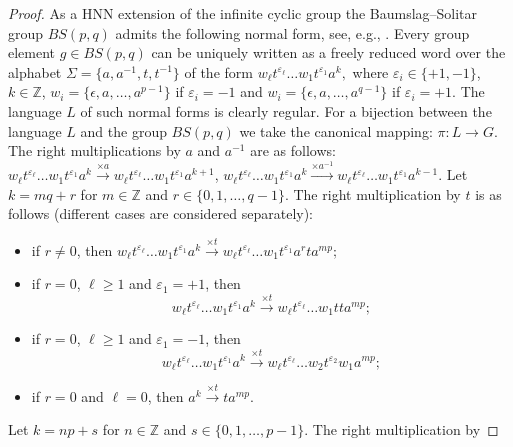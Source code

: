 \documentclass[article,12pt]{elsarticle}
\begin{document}
\begin{proof}
 	As a HNN extension of the infinite cyclic 
 	group the Baumslag--Solitar group 
 	$BS(p,q)$ 
 	admits the following normal form, see, e.g., 
 	\cite[Chapter~IV]{LyndonSchuppbook}.       
 	Every group element $g \in BS(p,q)$ can 
 	be uniquely written as a  
 	freely reduced word over the alphabet  
 	$\Sigma = \{a, a^{-1}, t, t^{-1}\}$
 	of the form
 	$
 	w_\ell t^{\varepsilon_\ell} \dots
 	w_1 t^{\varepsilon_1} a^k,    
 	$
 	where $\varepsilon_i \in \{+1,-1\}$, $k \in \mathbb{Z}$,  
 	$w_i = \{\epsilon, a, \dots, a^{p-1}\}$  
 	if $\varepsilon_i  = -1$ and
 	$w_i = \{\epsilon, a, \dots, a^{q-1}\}$ 
 	if $\varepsilon_i = +1$. 
 	The language $L$ of such normal forms is clearly 
 	regular.
 	For a bijection between the language $L$ and the 
 	group $BS(p,q)$ we take the canonical mapping: 
 	$\pi : L \rightarrow G$.  
 	The right multiplications by $a$ and 
 	$a^{-1}$ are as follows: 
 	$
 	w_\ell t^{\varepsilon_\ell} \dots
 	w_1 t^{\varepsilon_1} a^k \xrightarrow {\times a}
 	w_\ell t^{\varepsilon_\ell} \dots  
 	w_1 t^{\varepsilon_1} a^{k+1}$,
 	$   
 	w_\ell t^{\varepsilon_\ell} \dots
 	w_1 t^{\varepsilon_1} a^k \xrightarrow {\times a^{-1}}
 	w_\ell t^{\varepsilon_\ell} \dots  
 	w_1 t^{\varepsilon_1} a^{k-1}.
 	$
 	Let $k = m q + r$ for $m \in \mathbb{Z}$ and 
 	$r \in \{0,1,\dots,q-1\}$. 
 	The right multiplication by 
 	$t$ is as follows (different cases are
 	considered separately):    
 	\begin{itemize}
 		\item{if $r \neq 0$, then  
 			$w_\ell t^{\varepsilon_\ell} \dots
 			w_1 t^{\varepsilon_1} a^k \xrightarrow {\times t}
 			w_\ell t^{\varepsilon_\ell} \dots
 			w_1 t^{\varepsilon_1} a^r t a^{mp};$} 
 		\item{if $r = 0$, $\ell \geqslant 1$ and 
 			$\varepsilon_1 = +1$, then
 			$$w_\ell t^{\varepsilon_\ell} \dots
 			w_1 t^{\varepsilon_1} a^k \xrightarrow {\times t} 
 			w_\ell t^{\varepsilon_\ell} \dots
 			w_1 t t a^{mp};
 			$$
 		}  
 		\item{if $r=0$, $\ell \geqslant 1$ and 
 			$\varepsilon_1 = -1$, then 
 			$$  
 			w_\ell t^{\varepsilon_\ell} \dots
 			w_1 t^{\varepsilon_1} a^k \xrightarrow {\times t}
 			w_\ell t^{\varepsilon_\ell} \dots
 			w_2 t^{\varepsilon_2} w_1 a^{mp}; 
 			$$
 		} 
 		\item{if $r=0$ and $\ell=0$, then
 			$a^k \xrightarrow {\times t} t a^{mp}$. 
 		}  
 	\end{itemize}
 	Let $k= n p  + s$ for $n \in \mathbb{Z}$ and $s \in  \{0,1,\dots,p-1\}$. The right multiplication by 

\end{proof}
\end{document}
